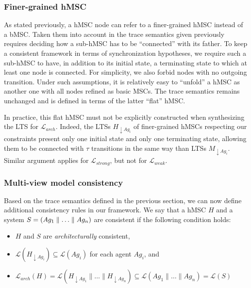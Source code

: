 \subsubsection*{Finer-grained hMSC}

As stated previously, a hMSC node can refer to a finer-grained hMSC instead of a bMSC. Taken them into account in the trace semantics given previously requires deciding how a sub-hMSC has to be ``connected'' with its father. To keep a consistent framework in terms of synchronization hypotheses, we require such a sub-hMSC to have, in addition to its initial state, a terminating state to which at least one node is connected. For simplicity, we also forbid nodes with no outgoing transition. Under such assumptions, it is relatively easy to ``unfold'' a hMSC as another one with all nodes refined as basic MSCs. The trace semantics remains unchanged and is defined in terms of the latter ``flat'' hMSC. 

In practice, this flat hMSC must not be explicitly constructed when synthesizing the LTS for $\mathcal{L}_{arch}$. Indeed, the LTSs $H_{\downarrow Ag_i}$ of finer-grained hMSCs respecting our constraints present only one initial state and only one terminating state, allowing them to be connected with $\tau$ transitions in the same way than LTSs $M_{\downarrow Ag_i}$. Similar argument applies for $\mathcal{L}_{strong}$, but not for $\mathcal{L}_{weak}$.

\subsubsection*{Multi-view model consistency}
 
Based on the trace semantics defined in the previous section, we can now define additional consistency rules in our framework. We say that a hMSC $H$ and a system $S = (Ag_1 \parallel \ldots \parallel Ag_n)$ are consistent if the following condition holds:

\begin{itemize}
\item $H$ and $S$ are \emph{architecturally} consistent,
\item $\mathcal{L}(H_{\downarrow Ag_i}) \subseteq \mathcal{L}(Ag_i)$ for each agent $Ag_i$, and
\item $\mathcal{L}_{arch}(H) = \mathcal{L}(H_{\downarrow Ag_1} \parallel \ldots \parallel H_{\downarrow Ag_n}) \subseteq \mathcal{L}(Ag_1 \parallel \ldots \parallel Ag_n) = \mathcal{L}(S)$
\end{itemize}

